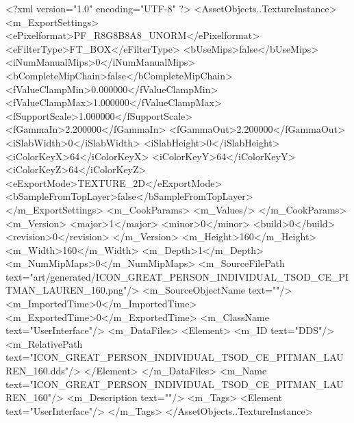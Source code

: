 <?xml version="1.0" encoding="UTF-8" ?>
<AssetObjects..TextureInstance>
	<m_ExportSettings>
		<ePixelformat>PF_R8G8B8A8_UNORM</ePixelformat>
		<eFilterType>FT_BOX</eFilterType>
		<bUseMips>false</bUseMips>
		<iNumManualMips>0</iNumManualMips>
		<bCompleteMipChain>false</bCompleteMipChain>
		<fValueClampMin>0.000000</fValueClampMin>
		<fValueClampMax>1.000000</fValueClampMax>
		<fSupportScale>1.000000</fSupportScale>
		<fGammaIn>2.200000</fGammaIn>
		<fGammaOut>2.200000</fGammaOut>
		<iSlabWidth>0</iSlabWidth>
		<iSlabHeight>0</iSlabHeight>
		<iColorKeyX>64</iColorKeyX>
		<iColorKeyY>64</iColorKeyY>
		<iColorKeyZ>64</iColorKeyZ>
		<eExportMode>TEXTURE_2D</eExportMode>
		<bSampleFromTopLayer>false</bSampleFromTopLayer>
	</m_ExportSettings>
	<m_CookParams>
		<m_Values/>
	</m_CookParams>
	<m_Version>
		<major>1</major>
		<minor>0</minor>
		<build>0</build>
		<revision>0</revision>
	</m_Version>
	<m_Height>160</m_Height>
	<m_Width>160</m_Width>
	<m_Depth>1</m_Depth>
	<m_NumMipMaps>0</m_NumMipMaps>
	<m_SourceFilePath text="art/generated/ICON_GREAT_PERSON_INDIVIDUAL_TSOD_CE_PITMAN_LAUREN_160.png"/>
	<m_SourceObjectName text=""/>
	<m_ImportedTime>0</m_ImportedTime>
	<m_ExportedTime>0</m_ExportedTime>
	<m_ClassName text="UserInterface"/>
	<m_DataFiles>
		<Element>
			<m_ID text="DDS"/>
			<m_RelativePath text="ICON_GREAT_PERSON_INDIVIDUAL_TSOD_CE_PITMAN_LAUREN_160.dds"/>
		</Element>
	</m_DataFiles>
	<m_Name text="ICON_GREAT_PERSON_INDIVIDUAL_TSOD_CE_PITMAN_LAUREN_160"/>
	<m_Description text=""/>
	<m_Tags>
		<Element text="UserInterface"/>
	</m_Tags>
</AssetObjects..TextureInstance>

